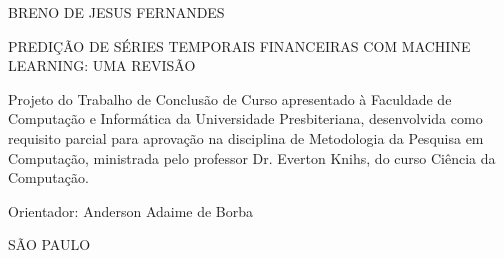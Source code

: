 \begin{titlepage}
    \centering

    \large BRENO DE JESUS FERNANDES\\
    \vspace{8cm}

    \large PREDIÇÃO DE SÉRIES TEMPORAIS FINANCEIRAS COM MACHINE LEARNING: UMA REVISÃO\\
    \vspace*{4cm}

    \begin{flushright}
        
        \begin{addmargin}[7cm]{0em}
            \small
            Projeto do Trabalho de Conclusão de Curso apresentado
            à Faculdade de Computação e Informática da Universidade Presbiteriana,
            desenvolvida como requisito parcial para aprovação na disciplina de Metodologia
            da Pesquisa em Computação, ministrada pelo professor Dr. Everton Knihs,
            do curso Ciência da Computação.
        \end{addmargin}
    \end{flushright}
    \vspace*{2cm}

    \begin{flushleft}
        \large Orientador: Anderson Adaime de Borba\\
    \end{flushleft}
    \vspace*{\fill}

    \large SÃO PAULO\\
    \large \the\year


\end{titlepage}